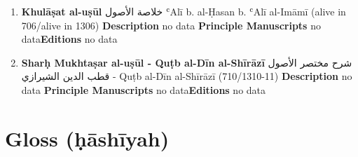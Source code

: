 \documentclass{article}
\begin{document}
\begin{enumerate}
      \item \textbf{Khulāṣat al-uṣūl}
        \newline
        \textarabic{خلاصة الأصول}
        \newline
        ʿAlī b. al-Ḥasan b. ʿAlī al-Imāmī
        \newline
        (alive in 706/alive in 1306)
        \newline
        \newline
        \textbf{Description}
        \newline	
        no data
        \newline
        \newline
    \textbf{Principle Manuscripts}
\newline
no data\newline\textbf{Editions}
\newline
no data\newline
      \item \textbf{Sharḥ Mukhtaṣar al-uṣūl - Quṭb al-Dīn al-Shīrāzī}
        \newline
        \textarabic{شرح مختصر الأصول - قطب الدين الشيرازي}
        \newline
        Quṭb al-Dīn al-Shīrāzī
        \newline
        (710/1310-11)
        \newline
        \newline
        \textbf{Description}
        \newline	
        no data
        \newline
        \newline
    \textbf{Principle Manuscripts}
\newline
no data\newline\textbf{Editions}
\newline
no data\newline\end{enumerate}\section{Gloss (ḥāshīyah)}
\end{document}
